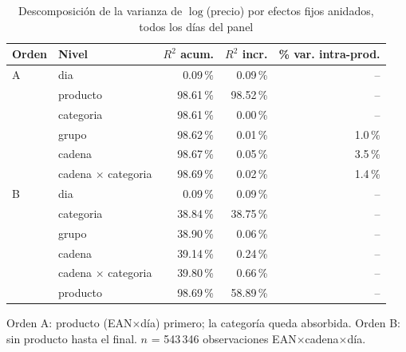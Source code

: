 \begin{table}[htbp]
\caption{Descomposici\'on de la varianza de $\log$(precio) por efectos fijos anidados, todos los d\'ias del panel}
\label{tab:varianza}
\centering\scriptsize\setlength{\tabcolsep}{3pt}
\begin{tabular}{@{}llrrr@{}}
\toprule
Orden & Nivel & $R^2$ acum. & $R^2$ incr. & \% var. intra-prod. \\
\midrule
A & dia & 0.09\,\% & 0.09\,\% & -- \\
 & producto & 98.61\,\% & 98.52\,\% & -- \\
 & categoria & 98.61\,\% & 0.00\,\% & -- \\
 & grupo & 98.62\,\% & 0.01\,\% & 1.0\,\% \\
 & cadena & 98.67\,\% & 0.05\,\% & 3.5\,\% \\
 & cadena $\times$ categoria & 98.69\,\% & 0.02\,\% & 1.4\,\% \\
\midrule
B & dia & 0.09\,\% & 0.09\,\% & -- \\
 & categoria & 38.84\,\% & 38.75\,\% & -- \\
 & grupo & 38.90\,\% & 0.06\,\% & -- \\
 & cadena & 39.14\,\% & 0.24\,\% & -- \\
 & cadena $\times$ categoria & 39.80\,\% & 0.66\,\% & -- \\
 & producto & 98.69\,\% & 58.89\,\% & -- \\
\bottomrule\end{tabular}
\par\smallskip\raggedright\scriptsize Orden A: producto (EAN$\times$d\'ia) primero; la categor\'ia queda absorbida. Orden B: sin producto hasta el final. $n$ = 543\,346 observaciones EAN$\times$cadena$\times$d\'ia.
\end{table}

